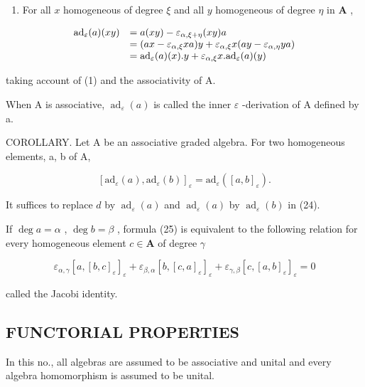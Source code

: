 \begin{enumerate}
\def\labelenumi{(\roman{enumi})}
\setcounter{enumi}{1}
\tightlist
\item
  For all \(x\) homogeneous of degree \(\xi\) and all \(y\) homogeneous of degree \(\eta\) in \(\mathbf{A}\) ,
\end{enumerate}

\[
\begin{array}{r l} \mathrm{ad} _ {\varepsilon} (a) (x y) & = a (x y) - \varepsilon_ {\alpha , \xi + \eta} (x y) a \\ & = (a x - \varepsilon_ {\alpha , \xi} x a) y + \varepsilon_ {\alpha , \xi} x (a y - \varepsilon_ {\alpha , \eta} y a) \\ & = \mathrm{ad} _ {\varepsilon} (a) (x). y + \varepsilon_ {\alpha , \xi} x. \mathrm{ad} _ {\varepsilon} (a) (y) \end{array}
\]

taking account of (1) and the associativity of A.

When A is associative, \(\operatorname{ad}_{\varepsilon}(a)\) is called the inner \(\varepsilon\) -derivation of A defined by a.

COROLLARY. Let A be an associative graded algebra. For two homogeneous elements, a, b of A,

\[
[ \mathrm{ad} _ {\varepsilon} (a), \mathrm{ad} _ {\varepsilon} (b) ] _ {\varepsilon} = \mathrm{ad} _ {\varepsilon} ([ a, b ] _ {\varepsilon}).\tag{25}
\]

It suffices to replace \(d\) by \(\operatorname{ad}_{\varepsilon}(a)\) and \(\operatorname{ad}_{\varepsilon}(a)\) by \(\operatorname{ad}_{\varepsilon}(b)\) in (24).

If \(\deg a = \alpha\) , \(\deg b = \beta\) , formula (25) is equivalent to the following relation for every homogeneous element \(c \in \mathbf{A}\) of degree \(\gamma\)

\[
\varepsilon_ {\alpha , \gamma} [ a, [ b, c ] _ {\varepsilon} ] _ {\varepsilon} + \varepsilon_ {\beta , \alpha} [ b, [ c, a ] _ {\varepsilon} ] _ {\varepsilon} + \varepsilon_ {\gamma , \beta} [ c, [ a, b ] _ {\varepsilon} ] _ {\varepsilon} = 0\tag{26}
\]

called the Jacobi identity.

\subsection{FUNCTORIAL PROPERTIES}

In this no., all algebras are assumed to be associative and unital and every algebra homomorphism is assumed to be unital.

